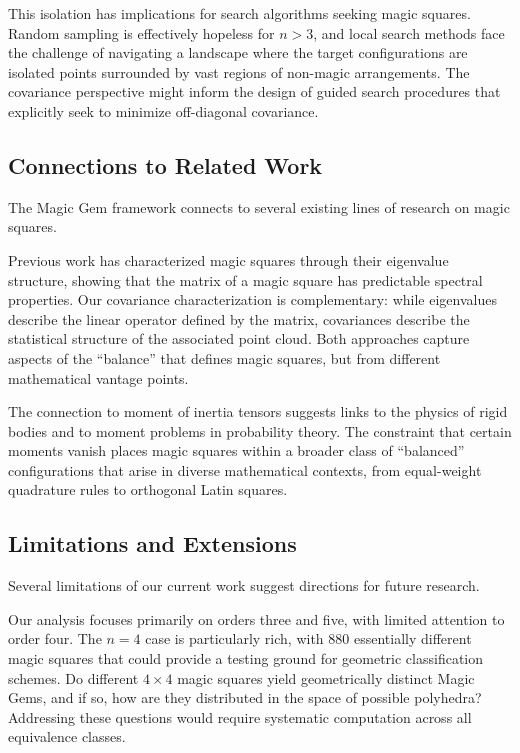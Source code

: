 This isolation has implications for search algorithms seeking magic squares.
Random sampling is effectively hopeless for $n > 3$, and local search methods face 
the challenge of navigating a landscape where the target configurations are isolated points 
surrounded by vast regions of non-magic arrangements.
The covariance perspective might inform the design of guided search procedures
that explicitly seek to minimize off-diagonal covariance.

\subsection{Connections to Related Work}

The Magic Gem framework connects to several existing lines of research on magic squares.

Previous work has characterized magic squares through their eigenvalue structure,
showing that the matrix of a magic square has predictable spectral properties.
Our covariance characterization is complementary: 
while eigenvalues describe the linear operator defined by the matrix,
covariances describe the statistical structure of the associated point cloud.
Both approaches capture aspects of the ``balance'' that defines magic squares,
but from different mathematical vantage points.

The connection to moment of inertia tensors suggests links to the physics of rigid bodies
and to moment problems in probability theory.
The constraint that certain moments vanish places magic squares within a broader class
of ``balanced'' configurations that arise in diverse mathematical contexts,
from equal-weight quadrature rules to orthogonal Latin squares.

\subsection{Limitations and Extensions}

Several limitations of our current work suggest directions for future research.

Our analysis focuses primarily on orders three and five, with limited attention to order four.
The $n = 4$ case is particularly rich, with 880 essentially different magic squares
that could provide a testing ground for geometric classification schemes.
Do different $4 \times 4$ magic squares yield geometrically distinct Magic Gems,
and if so, how are they distributed in the space of possible polyhedra?
Addressing these questions would require systematic computation across all equivalence classes.

